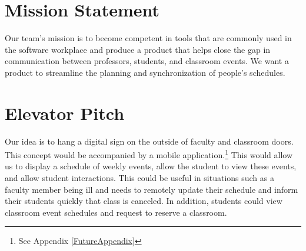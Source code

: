 
\section{Mission Statement}
Our team's mission is to become competent in tools that are commonly used in the software workplace and produce a product that helps close the gap in communication between professors, students, and classroom events. We want a product to streamline the planning and synchronization of people's schedules. 

\section{Elevator Pitch}
Our idea is to hang a digital sign on the outside of faculty and classroom doors. This concept would be accompanied by a mobile application.\footnote{See Appendix \ref{FutureAppendix}} This would allow us to display a schedule of weekly events, allow the student to view these events, and allow student interactions. This could be useful in situations such as a faculty member being ill and needs to remotely update their schedule and inform their students quickly that class is canceled. In addition, students could view classroom event schedules and request to reserve a classroom.
